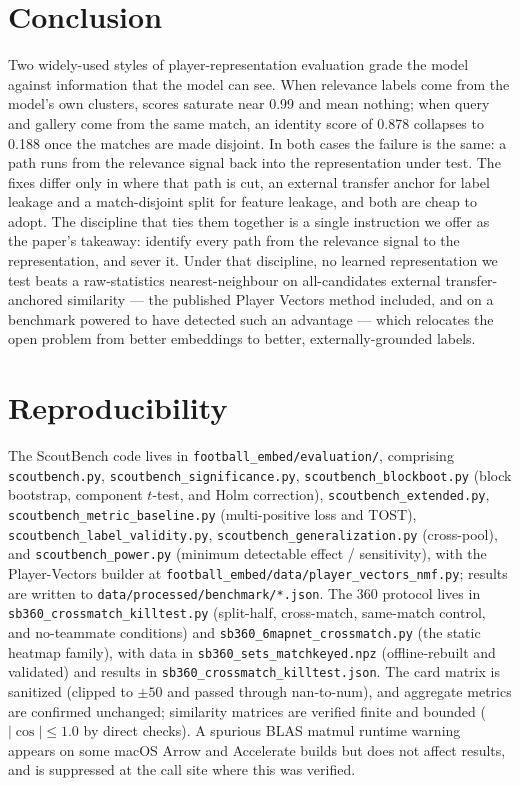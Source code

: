 \section{Conclusion}
\label{sec:conclusion}

Two widely-used styles of player-representation evaluation grade the model
against information that the model can see. When relevance labels come from the
model's own clusters, scores saturate near 0.99 and mean nothing; when query
and gallery come from the same match, an identity score of 0.878 collapses to
0.188 once the matches are made disjoint. In both cases the failure is the
same: a path runs from the relevance signal back into the representation under
test. The fixes differ only in where that path is cut, an external transfer
anchor for label leakage and a match-disjoint split for feature leakage, and
both are cheap to adopt. The discipline that ties them together is a single
instruction we offer as the paper's takeaway: identify every path from the
relevance signal to the representation, and sever it. Under that discipline, no
learned representation we test beats a raw-statistics nearest-neighbour on
all-candidates external transfer-anchored similarity --- the published Player
Vectors method included, and on a benchmark powered to have detected such an
advantage --- which relocates the open problem from better embeddings to better,
externally-grounded labels.

\section*{Reproducibility}
\label{sec:repro}

The ScoutBench code lives in \texttt{football\_embed/evaluation/}, comprising
\texttt{scoutbench.py}, \texttt{scoutbench\_significance.py},
\texttt{scoutbench\_blockboot.py} (block bootstrap, component $t$-test, and
Holm correction), \texttt{scoutbench\_extended.py},
\texttt{scoutbench\_metric\_baseline.py} (multi-positive loss and TOST),
\texttt{scoutbench\_label\_validity.py},
\texttt{scoutbench\_generalization.py} (cross-pool), and
\texttt{scoutbench\_power.py} (minimum detectable effect / sensitivity), with the
Player-Vectors builder at
\texttt{football\_embed/data/player\_vectors\_nmf.py}; results are
written to \texttt{data/processed/benchmark/*.json}. The 360 protocol lives in
\texttt{sb360\_crossmatch\_killtest.py} (split-half, cross-match, same-match
control, and no-teammate conditions) and
\texttt{sb360\_6mapnet\_crossmatch.py} (the static heatmap family), with data in
\texttt{sb360\_sets\_matchkeyed.npz} (offline-rebuilt and validated) and
results in \texttt{sb360\_crossmatch\_killtest.json}. The card matrix is
sanitized (clipped to $\pm 50$ and passed through nan-to-num), and aggregate
metrics are confirmed unchanged; similarity matrices are verified finite and
bounded ($|\cos| \le 1.0$ by direct checks). A spurious BLAS matmul runtime
warning appears on some macOS Arrow and Accelerate builds but does not affect
results, and is suppressed at the call site where this was verified.






